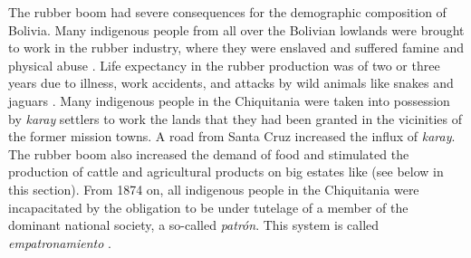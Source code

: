 The rubber boom had severe consequences for the demographic composition of Bolivia. Many indigenous people from all over the Bolivian lowlands were brought to work in the rubber industry, where they were enslaved and suffered famine and physical abuse \citep[cf.][]{Nordenskiold1923}. Life expectancy in the rubber production was of two or three years due to illness, work accidents, and attacks by wild animals like snakes and jaguars \citep[228]{Tonelli2004}.
Many indigenous people in the Chi\-qui\-ta\-nia were taken into possession by \textit{karay} settlers to work the lands that they had been granted in the vicinities of the former mission towns. A road from Santa Cruz  increased the influx of \textit{karay}. The rubber boom also increased the demand of food and stimulated the production of cattle and agricultural products on big estates like  (see below in this section). From 1874 on, all indigenous people in the Chi\-qui\-ta\-nia were incapacitated by the obligation to be under tutelage of a member of the dominant national society, a so-called \textit{patrón}. This system is called \textit{empatronamiento} \citep[57--58]{APCOB_Saberes}. 

